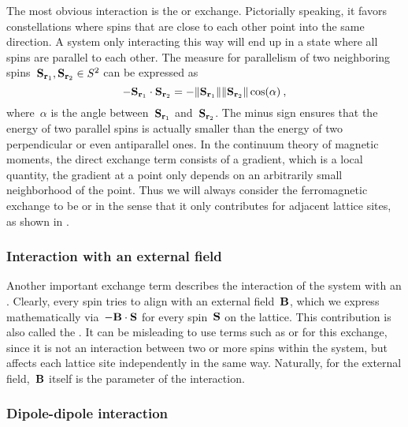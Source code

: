 The most obvious interaction is the  or 
exchange. Pictorially speaking, it favors constellations where spins that are
close to each other point into the same direction. A system only interacting
this way will end up in a state where all spins are parallel to each other. The
measure for parallelism of two neighboring spins~$\S_{\r_1}, \S_{\r_2} \in S^2$
can be expressed as
%
\begin{equation}
  -\S_{\r_1} \cdot \S_{\r_2} =
  -\norm{\S_{\r_1}} \norm{\S_{\r_2}} \cos(\alpha) \:,
\end{equation}
%
where~$\alpha$ is the angle between~$\S_{\r_1}$ and~$\S_{\r_2}$. The minus sign
ensures that the energy of two parallel spins is actually smaller than the
energy of two perpendicular or even antiparallel ones. In the continuum theory
of magnetic moments, the direct exchange term consists of a gradient, which is a
local quantity, \ie{} the gradient at a point only depends on an arbitrarily
small neighborhood of the point. Thus we will always consider the ferromagnetic
exchange to be  or  in the sense that it
only contributes for adjacent lattice sites, as shown in .

\subsubsection{Interaction with an external field}

Another important exchange term describes the interaction of the system with an
. Clearly, every spin tries to align with an
external field~$\B$, which we express mathematically via~$-\B \cdot \S$ for
every spin~$\S$ on the lattice. This contribution is also called the
. It can be misleading to use terms such as
 or  for this exchange, since it is not
an interaction between two or more spins within the system, but affects each
lattice site independently in the same way. Naturally, for the external
field,~$\B$ itself is the parameter of the interaction.

\subsubsection{Dipole-dipole interaction}

